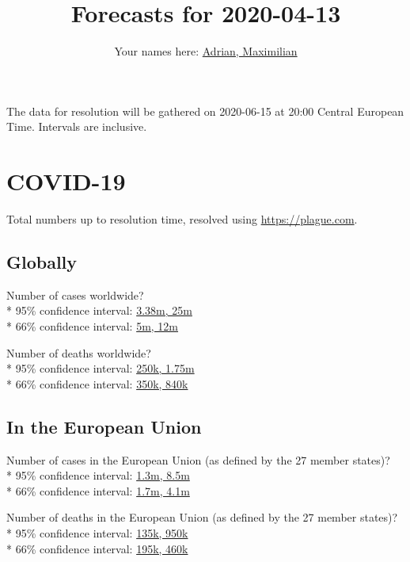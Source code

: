 \documentclass{article}
\title{Forecasts for 2020-04-13}
\begin{document}
\date{\vspace{-7ex}}

\author{Your names here: \underline{Adrian, Maximilian}}

\maketitle

\vspace{0.5cm}

The data for resolution will be gathered on 2020-06-15 at 20:00 Central
European Time. Intervals are inclusive.

\section*{COVID-19}

Total numbers up to resolution time, resolved using
\href{https://plague.com/}{https://plague.com}.

\subsection*{Globally}

Number of cases worldwide?\\*
95\% confidence interval: \null\hfill\underline{3.38m, 25m}\\*
66\% confidence interval: \null\hfill\underline{5m, 12m}

\vspace{0.3cm}

Number of deaths worldwide?\\*
95\% confidence interval: \null\hfill\underline{250k, 1.75m}\\*
66\% confidence interval: \null\hfill\underline{350k, 840k}

\subsection*{In the European Union}

Number of cases in the European Union (as defined by the 27 member
states)?\\*
95\% confidence interval: \null\hfill\underline{1.3m, 8.5m}\\*
66\% confidence interval: \null\hfill\underline{1.7m, 4.1m}

\vspace{0.3cm}

Number of deaths in the European Union (as defined by the 27 member
states)?\\*
95\% confidence interval: \null\hfill\underline{135k, 950k}\\*
66\% confidence interval: \null\hfill\underline{195k, 460k}
\end{document}
